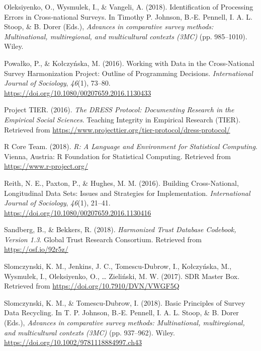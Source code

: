 \documentclass[12pt,]{article}
\begin{document}
\leavevmode\hypertarget{ref-Oleksiyenko2018}{}%
Oleksiyenko, O., Wysmulek, I., \& Vangeli, A. (2018). Identification of Processing Errors in Cross‐national Surveys. In Timothy P. Johnson, B.-E. Pennell, I. A. L. Stoop, \& B. Dorer (Eds.), \emph{Advances in comparative survey methods: Multinational, multiregional, and multicultural contexts (3MC)} (pp. 985--1010). Wiley.

\leavevmode\hypertarget{ref-Powako2016}{}%
Powałko, P., \& Kołczyńska, M. (2016). Working with Data in the Cross-National Survey Harmonization Project: Outline of Programming Decisions. \emph{International Journal of Sociology}, \emph{46}(1), 73--80. \url{https://doi.org/10.1080/00207659.2016.1130433}

\leavevmode\hypertarget{ref-ProjectTIER2016}{}%
Project TIER. (2016). \emph{The DRESS Protocol: Documenting Research in the Empirical Social Sciences}. Teaching Integrity in Empirical Research (TIER). Retrieved from \url{https://www.projecttier.org/tier-protocol/dress-protocol/}

\leavevmode\hypertarget{ref-baser}{}%
R Core Team. (2018). \emph{R: A Language and Environment for Statistical Computing}. Vienna, Austria: R Foundation for Statistical Computing. Retrieved from \url{https://www.r-project.org/}

\leavevmode\hypertarget{ref-Reith2016}{}%
Reith, N. E., Paxton, P., \& Hughes, M. M. (2016). Building Cross-National, Longitudinal Data Sets: Issues and Strategies for Implementation. \emph{International Journal of Sociology}, \emph{46}(1), 21--41. \url{https://doi.org/10.1080/00207659.2016.1130416}

\leavevmode\hypertarget{ref-Sandberg2018}{}%
Sandberg, B., \& Bekkers, R. (2018). \emph{Harmonized Trust Database Codebook, Version 1.3}. Global Trust Research Consortium. Retrieved from \url{https://osf.io/92r5z/}

\leavevmode\hypertarget{ref-Slomczynskietal2017}{}%
Slomczynski, K. M., Jenkins, J. C., Tomescu-Dubrow, I., Kołczyńska, M., Wysmułek, I., Oleksiyenko, O., \ldots{} Zieliński, M. W. (2017). SDR Master Box. Retrieved from \url{https://doi.org/10.7910/DVN/VWGF5Q}

\leavevmode\hypertarget{ref-Slomczynski2018}{}%
Slomczynski, K. M., \& Tomescu-Dubrow, I. (2018). Basic Principles of Survey Data Recycling. In T. P. Johnson, B.-E. Pennell, I. A. L. Stoop, \& B. Dorer (Eds.), \emph{Advances in comparative survey methods: Multinational, multiregional, and multicultural contexts (3MC)} (pp. 937--962). Wiley. \url{https://doi.org/10.1002/9781118884997.ch43}
\end{document}
